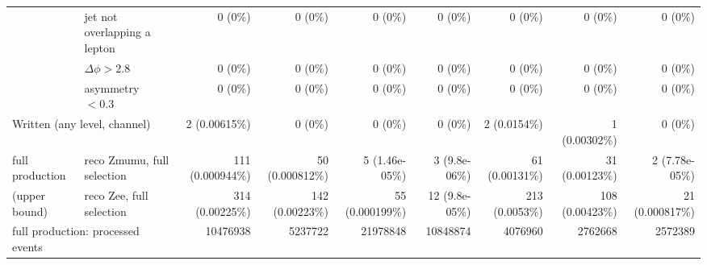 \begin{tabular}{llrrrrrrr}
 & jet not overlapping a lepton & 0 (0\%) & 0 (0\%) & 0 (0\%) & 0 (0\%) & 0 (0\%) & 0 (0\%) & 0 (0\%) \\
 & $\Delta\phi > 2.8$ & 0 (0\%) & 0 (0\%) & 0 (0\%) & 0 (0\%) & 0 (0\%) & 0 (0\%) & 0 (0\%) \\
 & asymmetry $< 0.3$ & 0 (0\%) & 0 (0\%) & 0 (0\%) & 0 (0\%) & 0 (0\%) & 0 (0\%) & 0 (0\%) \\
\midrule
\multicolumn{2}{l}{Written (any level, channel)} & 2 (0.00615\%) & 0 (0\%) & 0 (0\%) & 0 (0\%) & 2 (0.0154\%) & 1 (0.00302\%) & 0 (0\%) \\
\midrule
full production & reco Zmumu, full selection & 111 (0.000944\%) & 50 (0.000812\%) & 5 (1.46e-05\%) & 3 (9.8e-06\%) & 61 (0.00131\%) & 31 (0.00123\%) & 2 (7.78e-05\%) \\
(upper bound) & reco Zee, full selection & 314 (0.00225\%) & 142 (0.00223\%) & 55 (0.000199\%) & 12 (9.8e-05\%) & 213 (0.0053\%) & 108 (0.00423\%) & 21 (0.000817\%) \\
\multicolumn{2}{l}{full production: processed events} & 10476938 & 5237722 & 21978848 & 10848874 & 4076960 & 2762668 & 2572389 \\
\bottomrule
\end{tabular}
